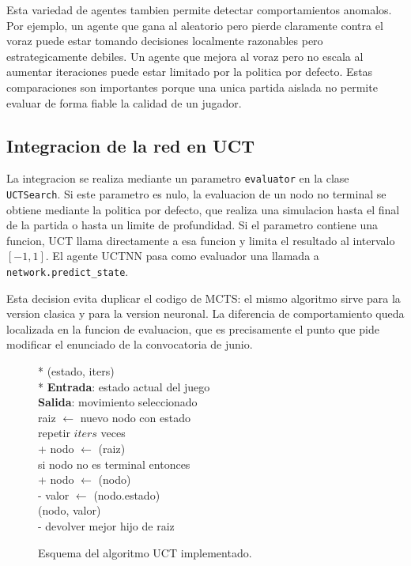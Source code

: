 \documentclass[conference,a4paper]{IEEEtran}
\begin{document}
Esta variedad de agentes tambien permite detectar comportamientos anomalos. Por
ejemplo, un agente que gana al aleatorio pero pierde claramente contra el voraz
puede estar tomando decisiones localmente razonables pero estrategicamente
debiles. Un agente que mejora al voraz pero no escala al aumentar iteraciones
puede estar limitado por la politica por defecto. Estas comparaciones son
importantes porque una unica partida aislada no permite evaluar de forma fiable
la calidad de un jugador.

\subsection{Integracion de la red en UCT}

La integracion se realiza mediante un parametro \texttt{evaluator} en la clase
\texttt{UCTSearch}. Si este parametro es nulo, la evaluacion de un nodo no
terminal se obtiene mediante la politica por defecto, que realiza una simulacion
hasta el final de la partida o hasta un limite de profundidad. Si el parametro
contiene una funcion, UCT llama directamente a esa funcion y limita el resultado
al intervalo \([-1,1]\). El agente UCTNN pasa como evaluador una llamada a
\texttt{network.predict\_state}.

Esta decision evita duplicar el codigo de MCTS: el mismo algoritmo sirve para la
version clasica y para la version neuronal. La diferencia de comportamiento
queda localizada en la funcion de evaluacion, que es precisamente el punto que
pide modificar el enunciado de la convocatoria de junio.

\begin{figure}[t]
\begin{pseudo}*
(estado, iters) \\*
\textbf{Entrada}: estado actual del juego \\
\textbf{Salida}: movimiento seleccionado \\
raiz \(\leftarrow\) nuevo nodo con estado \\
repetir \(iters\) veces \\+
  nodo \(\leftarrow\) (raiz) \\
  si nodo no es terminal entonces \\+
    nodo \(\leftarrow\) (nodo) \\-
  valor \(\leftarrow\) (nodo.estado) \\
  (nodo, valor) \\-
devolver mejor hijo de raiz
\end{pseudo}
\caption{Esquema del algoritmo UCT implementado.}
\label{pcd:uct}
\end{figure}
\end{document}
